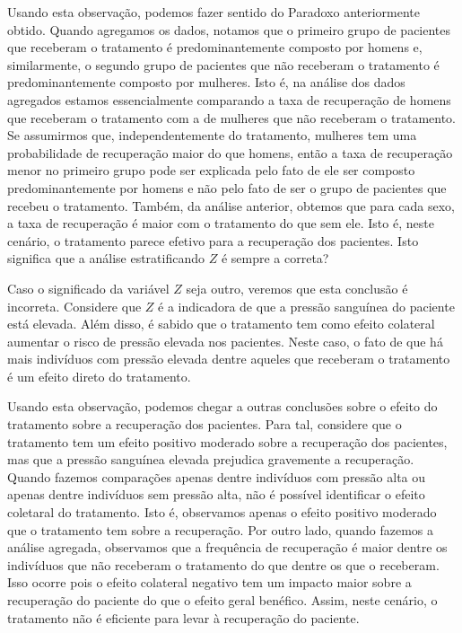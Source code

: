 Usando esta observação,
podemos fazer sentido do Paradoxo anteriormente obtido.
Quando agregamos os dados,
notamos que o primeiro grupo de pacientes que 
receberam o tratamento é predominantemente composto por homens e,
similarmente, o segundo grupo de 
pacientes que não receberam o tratamento é
predominantemente composto por mulheres.
Isto é, na análise dos dados agregados estamos 
essencialmente comparando a taxa de recuperação de homens 
que receberam o tratamento com
a de mulheres que não receberam o tratamento.
Se assumirmos que, independentemente do tratamento, 
mulheres tem uma probabilidade de recuperação maior do que homens,
então a taxa de recuperação menor no primeiro grupo pode ser explicada
pelo fato de ele ser composto predominantemente por homens e
não pelo fato de ser o grupo de pacientes que recebeu o tratamento.
Também, da análise anterior, obtemos que para cada sexo, 
a taxa de recuperação é maior com o tratamento  do que sem ele. 
Isto é, neste cenário, o tratamento parece efetivo para
a recuperação dos pacientes.
Isto significa que a análise estratificando $Z$ é sempre a correta?

Caso o significado da variável $Z$ seja outro, veremos que 
esta conclusão é incorreta.
Considere que $Z$ é a indicadora de que 
a pressão sanguínea do paciente está elevada.
Além disso, é sabido que o tratamento tem como
efeito colateral aumentar o risco de
pressão elevada nos pacientes.
Neste caso, o fato de que
há mais indivíduos com pressão elevada dentre aqueles que
receberam o tratamento é
um efeito direto do tratamento.

Usando esta observação,
podemos chegar a outras conclusões sobre o
efeito do tratamento sobre a recuperação dos pacientes.
Para tal, considere que o tratamento tem
um efeito positivo moderado sobre a recuperação dos pacientes,
mas que a pressão sanguínea elevada prejudica gravemente a recuperação.
Quando fazemos comparações apenas dentre indivíduos com pressão alta ou
apenas dentre indivíduos sem pressão alta, 
não é possível identificar o efeito coletaral do tratamento.
Isto é, observamos apenas
o efeito positivo moderado que o tratamento tem sobre a recuperação.
Por outro lado, quando fazemos a análise agregada,
observamos que a frequência de recuperação é 
maior dentre os indivíduos que não receberam o tratamento
do que dentre os que o receberam.
Isso ocorre pois o efeito colateral negativo tem um impacto
maior sobre a recuperação do paciente do que o efeito geral benéfico.
Assim, neste cenário, o tratamento não é
eficiente para levar à recuperação do paciente.

